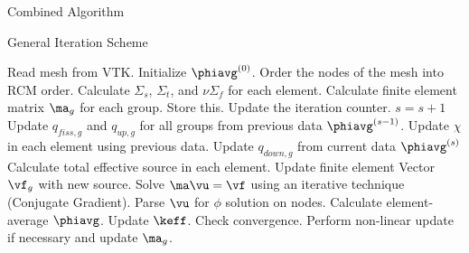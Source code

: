 \begin{frame}{Combined Algorithm}

    \begin{algorithm}[H]
      \caption{\scriptsize General Iteration Scheme}
      \label{algorithm:general}
      \begin{algorithmic}[1]
      \State Read mesh from VTK.
      \State Initialize $\phiavg^{(0)}$.
      \State Order the nodes of the mesh into RCM order.
        \label{state:rcm}
      \State Calculate $\Sigma_s$, $\Sigma_t$, and $\nu \Sigma_f$ for each 
        element.
      \State Calculate finite element matrix $\ma_g$ for each group. Store this. 
        \label{state:fem_matrix}
        \State Update the iteration counter. $s=s+1$
        \State Update $q_{fiss,g}$ and $q_{up,g}$ for all groups from previous 
          data $\phiavg^{(s-1)}$.
        \State Update $\chi$ in each element using previous data.
          \label{state:chi_collapse}
          \State Update $q_{down,g}$ from current data $\phiavg^{(s)}$
          \State Calculate total effective source in each element.
          \State Update finite element Vector $\vf_g$ with new source.
            \label{state:fem_vector}
          \State Solve $\ma \vu = \vf$ using an iterative technique (Conjugate
            Gradient).
          \State Parse $\vu$ for $\phi$ solution on nodes.
          \State Calculate element-average $\phiavg$.
        \EndFor
        \State Update $\keff$.
        \State Check convergence.
        \State Perform non-linear update if necessary and update $\ma_g$. 
          \label{state:nonlinear}
      \EndWhile
      \end{algorithmic}
    \end{algorithm}

\end{frame}
